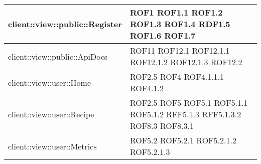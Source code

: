 \begin{center}
\begin{longtable}{| p{11cm} | p{2.5cm} |}
\hline
client::view::public::Register & ROF1 \newline ROF1.1 \newline ROF1.2 \newline ROF1.3 \newline ROF1.4 \newline RDF1.5 \newline ROF1.6 \newline ROF1.7 \\
\hline
client::view::public::ApiDocs & ROF11 \newline ROF12.1 \newline ROF12.1.1 \newline ROF12.1.2 \newline ROF12.1.3 \newline ROF12.2 \\
\hline
client::view::user::Home & ROF2.5 \newline ROF4 \newline ROF4.1.1.1 \newline ROF4.1.2 \\
\hline
client::view::user::Recipe & ROF2.5 \newline ROF5 \newline ROF5.1 \newline ROF5.1.1 \newline ROF5.1.2 \newline RFF5.1.3 \newline RFF5.1.3.2 \newline ROF8.3 \newline ROF8.3.1 \\
\hline
client::view::user::Metrics & ROF5.2 \newline ROF5.2.1 \newline ROF5.2.1.2 \newline ROF5.2.1.3 \\
\hline

\end{longtable}
\end{center}
